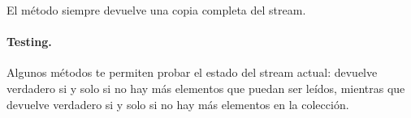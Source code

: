\documentclass[a4paper,10pt,twoside]{book}
\begin{document}
El m\'etodo  siempre devuelve una copia completa del stream.

\paragraph{Testing.} Algunos m\'etodos te permiten probar el estado del stream actual:
 devuelve verdadero si y solo si no hay m\'as elementos que puedan ser le\'idos, 
mientras que  devuelve verdadero si y solo si no hay m\'as elementos en la colecci\'on.
\end{document}
